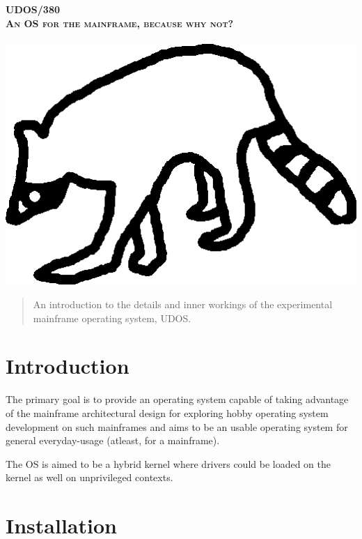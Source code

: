 \documentclass{article}
\begin{document}
\makeatletter
\begin{titlepage}
	\begin{center}
	\fontsize{20}{24}\bfseries\scshape UDOS/380 \\
	\fontsize{14}{24}\bfseries\scshape
	An OS for the mainframe, because why not? \\
	\@date \\
	\includegraphics[width=\textwidth]{raccoon}
	\end{center}
\end{titlepage}

\newpage
{}
\newpage

\begin{abstract}
An introduction to the details and inner workings of the experimental mainframe operating system, UDOS.
\end{abstract}

\section{Introduction}
The primary goal is to provide an operating system capable of taking advantage of the mainframe architectural design for exploring hobby operating system development on such mainframes and aims to be an usable operating system for general everyday-usage (atleast, for a mainframe).

The OS is aimed to be a hybrid kernel where drivers could be loaded on the kernel as well on unprivileged contexts.

\section{Installation}
\end{document}
